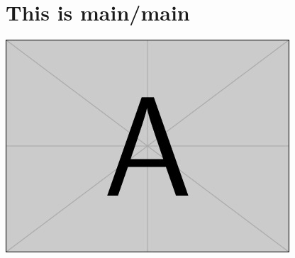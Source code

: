 \documentclass[../main]{subfiles}
\begin{document}
\section*{This is main/main}

\includegraphics{image1.jpg}

\end{document}
